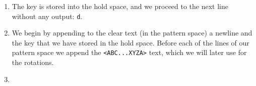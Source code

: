 \begin{enumerate}
	\item The key is stored into the hold space, and we proceed to the next
		line without any output: {\tt d}.
	\item We begin by appending to the clear text (in the pattern space) a
		newline and the key that we have stored in the hold space.  Before each
		of the lines of our pattern space we append the {\tt <ABC...XYZA>} text,
		which we will later use for the rotations.
	\item {}
\end{enumerate}



